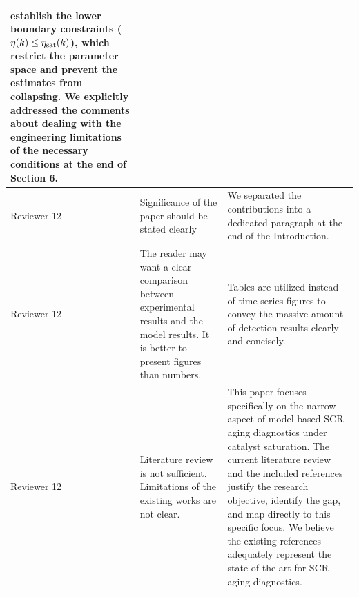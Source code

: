 \documentclass[letterpaper, 11pt]{article}
\begin{document}
\begin{longtable}{>{\raggedright\arraybackslash}p{}>{\raggedright\arraybackslash}p{}>{\raggedright\arraybackslash}p{}}
    establish the lower boundary constraints ($\eta(k) \le \eta_{\text{sat}}(k)$), which restrict the parameter space and
    prevent the estimates from collapsing.
    \newline\newline
    We explicitly addressed the comments about dealing with the engineering limitations of the necessary conditions at the end of Section 6.   \\ \midrule
    Reviewer 12                                                                                                                              &
    Significance of the paper should be stated clearly                                                                                       &
    We separated the contributions into a dedicated paragraph at the end of the Introduction.                                                  \\ \midrule
    Reviewer 12                                                                                                                              &
    The reader may want a clear comparison between experimental results and the model results. It is better to present figures than numbers. &
    Tables are utilized instead of time-series figures to convey the massive amount of detection results clearly and concisely.                \\ \midrule
    Reviewer 12                                                                                                                              &
    Literature review is not sufficient. Limitations of the existing works are not clear.                                                    &
    This paper focuses specifically on the narrow aspect of model-based SCR aging diagnostics under catalyst saturation. The current literature review and the included references justify the research objective, identify the gap, and map directly to this specific focus. We believe the existing references adequately represent the state-of-the-art for SCR aging diagnostics.
    \\ \bottomrule
\end{longtable}
\end{document}

